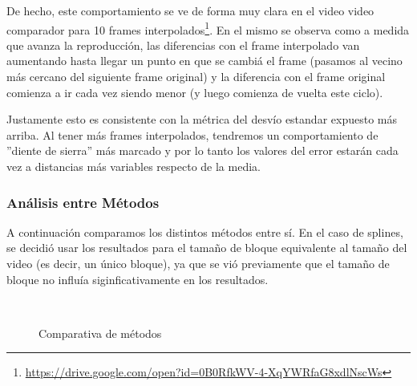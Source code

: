 \par De hecho, este comportamiento se ve de forma muy clara en el video
video comparador para 10 frames
interpolados\footnote{\url{https://drive.google.com/open?id=0B0RfkWV-4-XqYWRfaG8xdlNscWs}}.
En el mismo se observa como a medida que avanza la reproducci\'on, las
diferencias con el frame interpolado van aumentando hasta llegar un punto en
que se cambi\'a el frame (pasamos al vecino m\'as cercano del siguiente frame
original) y la diferencia con el frame original comienza a ir cada vez siendo
menor (y luego comienza de vuelta este ciclo).

\par Justamente esto es consistente con la m\'etrica del desv\'io estandar
expuesto m\'as arriba. Al tener m\'as frames interpolados, tendremos un
comportamiento de ''diente de sierra'' m\'as marcado y por lo tanto los valores
del error estar\'an cada vez a distancias m\'as variables respecto de la media.

\subsubsection{An\'alisis entre M\'etodos}
\par A continuaci\'on comparamos los distintos m\'etodos entre s\'i. En el caso
de splines, se decidi\'o usar los resultados para el tama\~no de bloque
equivalente al tama\~no del video (es decir, un \'unico bloque), ya que se
vi\'o previamente que el tama\~no de bloque no influ\'ia siginficativamente
en los resultados.

\begin{figure}[H]
    \centering
    \\
    \caption{Comparativa de m\'etodos}
    \label{fig:movil-fija_metodos}
\end{figure}

